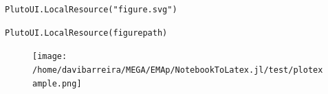 \begin{lstlisting}[language=JuliaLocal, style=julia]
PlutoUI.LocalResource("figure.svg")
\end{lstlisting}


\begin{lstlisting}[language=JuliaLocal, style=julia]
PlutoUI.LocalResource(figurepath)
\end{lstlisting}

\begin{figure}[H]
	\centering
	\texttt{[image: /home/davibarreira/MEGA/EMAp/NotebookToLatex.jl/test/plotexample.png]}
	\label{fig:/home/davibarreira/MEGA/EMAp/NotebookToLatex.jl/test/plotexample.png}

\end{figure}
